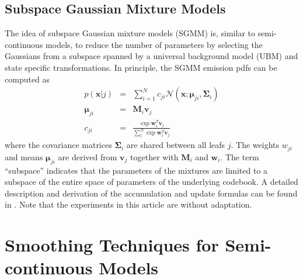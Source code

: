\documentclass{article}
\def \x{{\mathbf x}}
\def \v{{\mathbf v}}
\def \w{{\mathbf w}}
\def \M{{\mathbf M}}
\def \m{{\bm \mu}}
\def \k{{\mathbf \Sigma}}
\def \nv{{\mathcal N}}
\begin{document}
\subsection{Subspace Gaussian Mixture Models}
The idea of subspace Gaussian mixture models (SGMM) is, similar to 
semi-continuous models, to reduce the number of parameters by selecting the
Gaussians from a subspace spanned by a universal background model (UBM)
and state specific transformations. In principle, the SGMM emission pdfs can
be computed as
\begin{eqnarray}
p(\x | j) & = & \sum_{i=1}^{N} c_{ji} \nv(\x; \m_{ji}, \k_i) \\
\m_{ji}    & = & \M_i \v_j \\
c_{ji}     & = & \frac{\exp \w_i^T \v_j}{\sum_l^N \exp \w_l^T \v_j}
\end{eqnarray}
where the covariance matrices $\k_i$ are shared between all leafs $j$. The
weights $w_{ji}$ and means $\m_{ji}$ are derived from $\v_j$ together with
$\M_i$ and $\w_i$. The term ``subspace'' indicates that the parameters of the
mixtures are limited to a subspace of the entire space of parameters of
the underlying codebook.
%
A detailed description and derivation of the accumulation and update formulas
can be found in \cite{povey2011sgm}. Note that the experiments in this article
are without adaptation.

\section{Smoothing Techniques for Semi-continuous Models}
%
\end{document}
